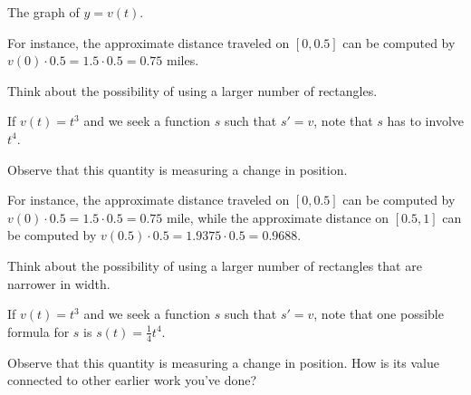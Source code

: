 \begin{marginfigure}[-2cm] %
\begin{center}
\end{center}
\caption{The graph of $y = v(t)$.} \label{F:4.1.Act1}
\end{marginfigure}
\begin{smallhint}
\ba
	\item For instance, the approximate distance traveled on $[0,0.5]$ can be computed by $v(0) \cdot 0.5 = 1.5 \cdot 0.5 = 0.75$ miles.
	\item Think about the possibility of using a larger number of rectangles.
	\item If $v(t) = t^3$ and we seek a function $s$ such that $s' = v$, note that $s$ has to involve $t^4$.
	\item Observe that this quantity is measuring a change in position.
\ea
\end{smallhint}
\begin{bighint}
\ba
	\item For instance, the approximate distance traveled on $[0,0.5]$ can be computed by $v(0) \cdot 0.5 = 1.5 \cdot 0.5 = 0.75$ mile, while the approximate distance on $[0.5,1]$ can be computed by $v(0.5) \cdot 0.5 = 1.9375 \cdot 0.5 = 0.9688$.
	\item Think about the possibility of using a larger number of rectangles that are narrower in width.
	\item If $v(t) = t^3$ and we seek a function $s$ such that $s' = v$, note that one possible formula for $s$ is $s(t) = \frac{1}{4}t^4$.
	\item Observe that this quantity is measuring a change in position.  How is its value connected to other earlier work you've done?
\ea
\end{bighint}
